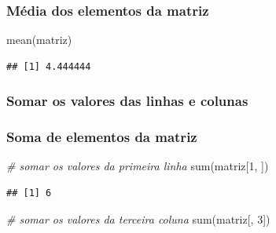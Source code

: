 \documentclass[
]{article}
\newenvironment{Shaded}{\begin{snugshade}}{\end{snugshade}}
\newcommand{\CommentTok}[1]{\textcolor[rgb]{0.56,0.35,0.01}{\textit{#1}}}
\newcommand{\DecValTok}[1]{\textcolor[rgb]{0.00,0.00,0.81}{#1}}
\newcommand{\FunctionTok}[1]{\textcolor[rgb]{0.00,0.00,0.00}{#1}}
\newcommand{\NormalTok}[1]{#1}
\begin{document}
\hypertarget{muxe9dia-dos-elementos-da-matriz}{%
\subsubsection{\texorpdfstring{\textbf{Média dos elementos da
matriz}}{Média dos elementos da matriz}}\label{muxe9dia-dos-elementos-da-matriz}}

\begin{Shaded}
\begin{Highlighting}[]
\FunctionTok{mean}\NormalTok{(matriz)}
\end{Highlighting}
\end{Shaded}

\begin{verbatim}
## [1] 4.444444
\end{verbatim}

\hypertarget{somar-os-valores-das-linhas-e-colunas}{%
\subsubsection{\texorpdfstring{\textbf{Somar os valores das linhas e
colunas}}{Somar os valores das linhas e colunas}}\label{somar-os-valores-das-linhas-e-colunas}}

\hypertarget{soma-de-elementos-da-matriz}{%
\subsubsection{\texorpdfstring{\textbf{Soma de elementos da
matriz}}{Soma de elementos da matriz}}\label{soma-de-elementos-da-matriz}}

\begin{Shaded}
\begin{Highlighting}[]
\CommentTok{\# somar os valores da primeira linha}
\FunctionTok{sum}\NormalTok{(matriz[}\DecValTok{1}\NormalTok{, ])}
\end{Highlighting}
\end{Shaded}

\begin{verbatim}
## [1] 6
\end{verbatim}

\begin{Shaded}
\begin{Highlighting}[]
\CommentTok{\# somar os valores da terceira coluna}
\FunctionTok{sum}\NormalTok{(matriz[, }\DecValTok{3}\NormalTok{])}
\end{Highlighting}
\end{Shaded}
\end{document}
